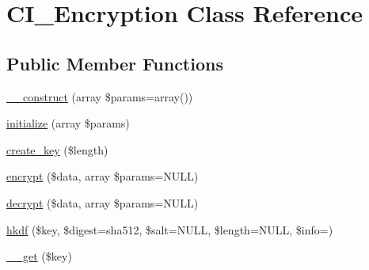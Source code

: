 \hypertarget{class_c_i___encryption}{}\section{C\+I\+\_\+\+Encryption Class Reference}
\label{class_c_i___encryption}
\subsection*{Public Member Functions}
\begin{DoxyCompactItemize}
\item 
\mbox{\hyperlink{class_c_i___encryption_a12af3822c33cd340974fa41d93ac79d7}{\+\_\+\+\_\+construct}} (array \$params=array())
\item 
\mbox{\hyperlink{class_c_i___encryption_a1275ae2e7caf102a5febc215c27811e1}{initialize}} (array \$params)
\item 
\mbox{\hyperlink{class_c_i___encryption_a76daf217f3016f58c58f5e81d1286ab8}{create\+\_\+key}} (\$length)
\item 
\mbox{\hyperlink{class_c_i___encryption_ac9fad80dae09307ea7b34d67e29bdad3}{encrypt}} (\$data, array \$params=N\+U\+LL)
\item 
\mbox{\hyperlink{class_c_i___encryption_ad04dbd781d79a687664ea025b056dece}{decrypt}} (\$data, array \$params=N\+U\+LL)
\item 
\mbox{\hyperlink{class_c_i___encryption_a3640a495aec7dd9b3fe8113f077bb6d5}{hkdf}} (\$key, \$digest=\textquotesingle{}sha512\textquotesingle{}, \$salt=N\+U\+LL, \$length=N\+U\+LL, \$info=\textquotesingle{}\textquotesingle{})
\item 
\mbox{\hyperlink{class_c_i___encryption_a67e4421751deb8056d719747c51f7a88}{\+\_\+\+\_\+get}} (\$key)
\end{DoxyCompactItemize}
